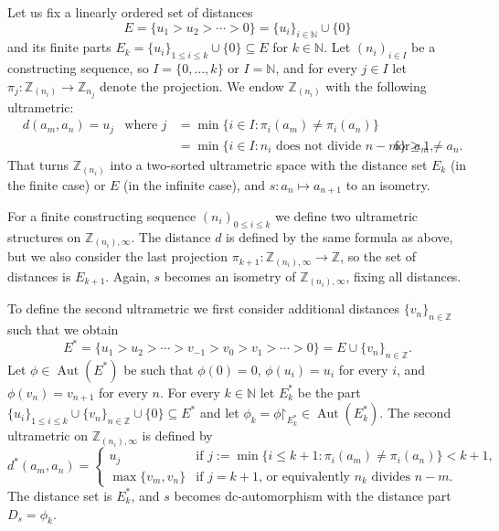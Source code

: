 \documentclass[10pt,a4paper]{article}
\theoremstyle{definition}
\theoremstyle{remark}
\newcommand \set [1]{\{#1\}}
\newcommand \maps {\colon} %
\newcommand \restr [1] {\mathord{\upharpoonright}_{#1}}
\newcommand \subs {\subseteq}
\newcommand \N {\mathbb{N}}
\newcommand \Z {\mathbb{Z}}
\newcommand \Aut {\operatorname{Aut}}
\let \aut \Aut
\begin{document}
Let us fix a linearly ordered set of distances
\[
    E = \set{u_1 > u_2 > \cdots > 0} = \set{u_i}_{i \in \N}  \cup \set{0}
\]
and its finite parts $E_k = \set{u_i}_{1 \leq i \leq k} \cup \set{0} \subs E$ for $k \in \N$.
Let $(n_i)_{i \in I}$ be a constructing sequence, so $I = \set{0, \ldots, k}$ or $I = \N$, and for every $j \in I$ let $\pi_j\maps \Z_{(n_i)} \to \Z_{n_j}$ denote the projection.
We endow $\Z_{(n_i)}$ with the following ultrametric:
\begin{align*}
    &d(a_m, a_n) = u_j & \text{where } j &= \min\set{i \in I: \pi_i(a_m) \neq \pi_i(a_n)} \\
        && &= \min\set{i \in I: n_i \text{ does not divide } n - m} \geq 1, & \text{for $a_m \neq a_n$}.
\end{align*}
That turns $\Z_{(n_i)}$ into a two-sorted ultrametric space with the distance set $E_k$ (in the finite case) or $E$ (in the infinite case), and $s\maps a_n \mapsto a_{n + 1}$ to  an isometry.

For a finite constructing sequence $(n_i)_{0 \leq i \leq k}$ we define two ultrametric structures on $\Z_{(n_i),\infty}$.
The distance $d$ is defined by the same formula as above, but we also consider the last projection $\pi_{k + 1} \maps \Z_{(n_i), \infty} \to \Z$, so the set of distances is $E_{k + 1}$.
Again, $s$ becomes an isometry of $\Z_{(n_i), \infty}$, fixing all distances.

To define the second ultrametric we first consider additional distances $\set{v_n}_{n \in \Z}$ such that we obtain
\[
    E^* = \set{u_1 > u_2 > \cdots > v_{-1} > v_0 > v_1 > \cdots > 0} = E \cup \set{v_n}_{n \in \Z}.
\]
Let $\phi \in \aut(E^*)$ be such that $\phi(0) = 0$, $\phi(u_i) = u_i$ for every $i$, and $\phi(v_n) = v_{n + 1}$ for every $n$.
For every $k \in \N$ let $E^*_k$ be the part $\set{u_i}_{1 \leq i \leq k} \cup \set{v_n}_{n \in \Z} \cup \set{0} \subs E^*$ and let $\phi_k = \phi\restr{E^*_k} \in \aut(E^*_k)$.
The second ultrametric on $\Z_{(n_i), \infty}$ is defined by 
\[
d^*(a_m, a_n) = \begin{cases}
    u_j & \text{if $j := \min\set{i \leq k + 1: \pi_i(a_m) \neq \pi_i(a_n)} < k + 1$,} \\
    \max\set{v_m, v_n} & \text{if $j = k + 1$, or equivalently $n_k$ divides $n - m$.}
\end{cases}
\]
The distance set is $E^*_k$, and $s$ becomes dc-automorphism with the distance part $D_s = \phi_k$.
\end{document}
